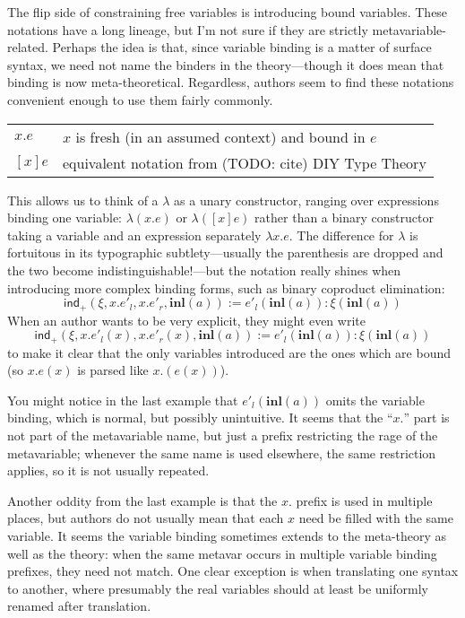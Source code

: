 \documentclass[11pt]{article} %
\theoremstyle{definition}
\theoremstyle{remark}
\begin{document}
The flip side of constraining free variables is introducing bound variables.
These notations have a long lineage, but I'm not sure if they are strictly metavariable-related.
Perhaps the idea is that, since variable binding is a matter of surface syntax, we need not name the binders in the theory---though it does mean that binding is now meta-theoretical.
Regardless, authors seem to find these notations convenient enough to use them fairly commonly.
\begin{center}
\renewcommand{\arraystretch}{1.2}
\begin{tabular}{lp{10cm}}
$x.e$ & $x$ is fresh (in an assumed context) and bound in $e$ \\
$[x]e$ & equivalent notation from (TODO: cite) DIY Type Theory \\
\end{tabular}
\end{center}
This allows us to think of a $\lambda$ as a unary constructor, ranging over expressions binding one variable: $\lambda(x.e)$ or $\lambda([x]e)$ rather than a binary constructor taking a variable and an expression separately $\lambda x.e$.
The difference for $\lambda$ is fortuitous in its typographic subtlety---usually the parenthesis are dropped and the two become indistinguishable!---but the notation really shines when introducing more complex binding forms, such as binary coproduct elimination:
  $$\mathsf{ind}_+(\xi, x.e'_l, x.e'_r, \mathbf{inl}(a)) \mathbin{:=} e'_l(\mathbf{inl}(a)) : \xi(\mathbf{inl}(a))$$
When an author wants to be very explicit, they might even write
  $$\mathsf{ind}_+(\xi, x.e'_l(x), x.e'_r(x), \mathbf{inl}(a)) \mathbin{:=} e'_l(\mathbf{inl}(a)) : \xi(\mathbf{inl}(a))$$
to make it clear that the only variables introduced are the ones which are bound (so $x.e(x)$ is parsed like $x.(e(x))$).

You might notice in the last example that $e'_l(\mathbf{inl}(a))$ omits the variable binding, which is normal, but possibly unintuitive.
It seems that the ``$x.$'' part is not part of the metavariable name, but just a prefix restricting the rage of the metavariable; whenever the same name is used elsewhere, the same restriction applies, so it is not usually repeated.

Another oddity from the last example is that the $x.$ prefix is used in multiple places, but authors do not usually mean that each $x$ need be filled with the same variable.
It seems the variable binding sometimes extends to the meta-theory as well as the theory: when the same metavar occurs in multiple variable binding prefixes, they need not match.
One clear exception is when translating one syntax to another, where presumably the real variables should at least be uniformly renamed after translation.
\end{document}
